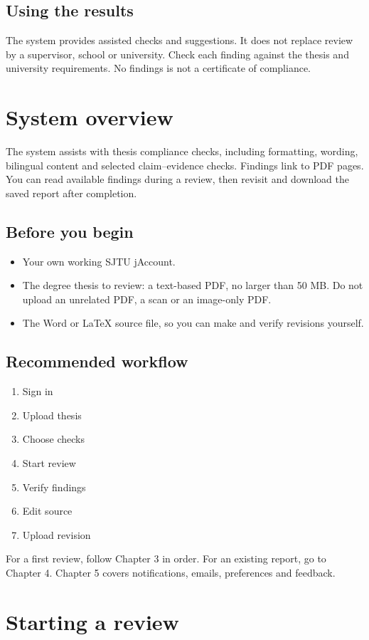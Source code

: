 \documentclass[12pt,a4paper]{article}
\newcommand{\note}[1]{\par\medskip\noindent\begingroup\setlength{\fboxsep}{9pt}\colorbox{pale}{\parbox{\dimexpr\linewidth-18pt\relax}{#1}}\endgroup\par}
\begin{document}
\subsection*{Using the results}The system provides assisted checks and suggestions. It does not replace review by a supervisor, school or university. Check each finding against the thesis and university requirements. No findings is not a certificate of compliance.\par
\clearpage\section{System overview}\label{en:overview}
The system assists with thesis compliance checks, including formatting, wording, bilingual content and selected claim–evidence checks. Findings link to PDF pages. You can read available findings during a review, then revisit and download the saved report after completion.
\subsection*{Before you begin}
\begin{itemize}\item Your own working SJTU jAccount.\item The degree thesis to review: a text-based PDF, no larger than 50 MB. Do not upload an unrelated PDF, a scan or an image-only PDF.\item The Word or LaTeX source file, so you can make and verify revisions yourself.\end{itemize}
\subsection*{Recommended workflow}
\begin{enumerate}\item Sign in\item Upload thesis\item Choose checks\item Start review\item Verify findings\item Edit source\item Upload revision\end{enumerate}
\note{For a first review, follow Chapter 3 in order. For an existing report, go to Chapter 4. Chapter 5 covers notifications, emails, preferences and feedback.}
\clearpage\section{Starting a review}\label{en:basic}
\end{document}
